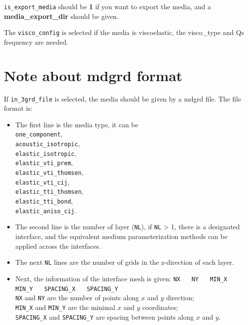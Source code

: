 \texttt{is\_export\_media} should be \textbf{1} if you want to export the media, and a \textbf{media\_export\_dir} should be given. 

The \texttt{visco\_config} is selected if the media is viscoelastic, the visco\_type and Qs frequency are needed.

\section{Note about mdgrd format} \label{mdgrd}
If \texttt{in\_3grd\_file} is selected, the media should be given by a mdgrd file. The file format is:

\begin{itemize}
 \item The first line is the media type, it can be \\
 \texttt{one\_component}, \\ 
 \texttt{acoustic\_isotropic}, \\
 \texttt{elastic\_isotropic}, \\
 \texttt{elastic\_vti\_prem}, \\
 \texttt{elastic\_vti\_thomsen}, \\ 
 \texttt{elastic\_vti\_cij}, \\
 \texttt{elastic\_tti\_thomsen}, \\ 
 \texttt{elastic\_tti\_bond}, \\
 \texttt{elastic\_aniso\_cij}.

 \item The second line is the number of layer (\texttt{NL}), if \texttt{NL} > 1, there is a designated interface, and the equivalent medium parameterization methods can be applied across the interfaces.

 \item The next \texttt{NL} lines are the number of grids in the z-direction of each layer.
  
 \item {Next, the information of the interface mesh is given:
  \texttt{NX} ~~ \texttt{NY} ~~ \texttt{MIN\_X} ~~ \texttt{MIN\_Y} ~~ \texttt{SPACING\_X} ~~ \texttt{SPACING\_Y}\\
  \texttt{NX} and \texttt{NY} are the number of points along $x$ and $y$ direction;\\
  \texttt{MIN\_X} and \texttt{MIN\_Y} are the minimal $x$ and $y$ coordinates;\\
  \texttt{SPACING\_X} and \texttt{SPACING\_Y} are spacing between points along $x$ and $y$.
 }


\end{itemize}

